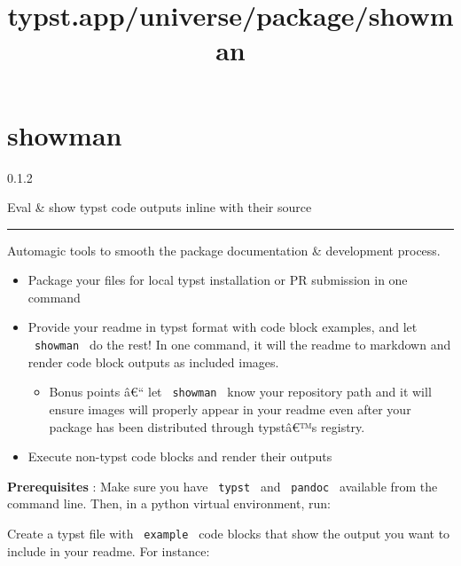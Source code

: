\title{typst.app/universe/package/showman}

\label{banner}
\section{showman}\label{showman}

{ 0.1.2 }

Eval \& show typst code outputs inline with their source

\label{readme}

\begin{center}\rule{0.5\linewidth}{0.5pt}\end{center}

Automagic tools to smooth the package documentation \& development
process.

\begin{itemize}
\item
  Package your files for local typst installation or PR submission in
  one command
\item
  Provide your readme in typst format with code block examples, and let
  \texttt{\ showman\ } do the rest! In one command, it will the readme
  to markdown and render code block outputs as included images.

  \begin{itemize}
  \tightlist
  \item
    Bonus points â€`` let \texttt{\ showman\ } know your repository path
    and it will ensure images will properly appear in your readme even
    after your package has been distributed through typstâ€™s registry.
  \end{itemize}
\item
  Execute non-typst code blocks and render their outputs
\end{itemize}

\textbf{Prerequisites} : Make sure you have \texttt{\ typst\ } and
\texttt{\ pandoc\ } available from the command line. Then, in a python
virtual environment, run:

\begin{Shaded}
\begin{Highlighting}[]
\end{Highlighting}
\end{Shaded}

Create a typst file with
\texttt{\ \textasciigrave{}\textasciigrave{}\textasciigrave{}example\ }
code blocks that show the output you want to include in your readme. For
instance:

